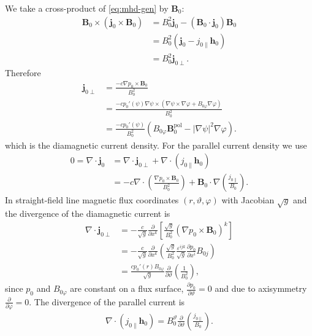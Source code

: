 \documentclass[a4paper, 10pt, english]{article}
\let\temp\vartheta
\let\vartheta\theta
\let\theta\temp
\let\temp\varphi
\let\varphi\phi
\let\phi\temp
\let\vec\symbf
\newcommand*\pd[2][]{\ensuremath{\frac{\partial #1}{\partial #2}}}  %
\newcommand*\pol{\ensuremath{\textrm{pol}}}  %
\begin{document}
We take a cross-product of \cref{eq:mhd-gen} by $\vec{B}_{0}$:
\begin{align}
  \vec{B}_{0} \times \left( \vec{j}_{0} \times \vec{B}_{0} \right) &= B_{0}^{2} \vec{j}_{0} - (\vec{B}_{0} \cdot \vec{j}_{0}) \vec{B}_{0} \nonumber \\
  &= B_{0}^{2} (\vec{j}_{0} - j_{0 \parallel} \vec{h}_{0}) \nonumber \\
  &= B_{0}^{2} \vec{j}_{0 \perp}.
\end{align}
Therefore
\begin{align}
  \vec{j}_{0 \perp} &= \frac{-c \nabla p_{0} \times \vec{B}_{0}}{B_{0}^{2}} \\
  &= \frac{-c p_{0}' (\psi) \nabla \psi \times (\nabla \psi \times \nabla \phi + B_{0 \phi} \nabla \phi)}{B_{0}^{2}} \nonumber \\
  &= \frac{-c p_{0}' (\psi)}{B_{0}^{2}} \left( B_{0 \phi} \vec{B}_{0}^{\pol} - \lvert \nabla \psi \rvert^{2} \nabla \phi \right).
\end{align}
which is the diamagnetic current density. For the parallel current density we use
\begin{align}
 0 = \nabla \cdot \vec{j}_{0} &= \nabla \cdot \vec{j}_{0 \perp} + \nabla \cdot (j_{0 \parallel} \vec{h}_{0}) \nonumber \\
 &= -c \nabla \cdot \left( \frac{\nabla p_{0} \times \vec{B}_{0}}{B_{0}^{2}} \right) + \vec{B}_{0} \cdot \nabla \left( \frac{j_{0 \parallel}}{B_{0}} \right).
\end{align}
In straight-field line magnetic flux coordinates $(r, \theta, \phi)$ with Jacobian $\sqrt{g}$ and the divergence of the diamagnetic current is
\begin{align}
  \nabla \cdot \vec{j}_{0 \perp} &= -\frac{c}{\sqrt{g}} \pd{x^{k}} \left[ \frac{\sqrt{g}}{B_{0}^{2}} \left( \nabla p_{0} \times \vec{B}_{0} \right)^{k} \right] \nonumber \\
  &= -\frac{c}{\sqrt{g}} \pd{x^{k}} \left( \frac{\sqrt{g}}{B_{0}^{2}} \frac{\varepsilon^{ijk}}{\sqrt{g}} \pd[p_{0}]{x^{i}} B_{0 j} \right) \nonumber \\
  &= \frac{c p_{0}' (r) B_{0 \phi}}{\sqrt{g}} \pd{\theta} \left( \frac{1}{B_{0}^{2}} \right),
\end{align}
since $p_{0}$ and $B_{0 \phi}$ are constant on a flux surface, $\pd[p_{0}]{\theta} = 0$ and due to axisymmetry $\pd{\phi} = 0$. The divergence of the parallel current is
\begin{gather}
  \nabla \cdot(j_{0 \parallel} \vec{h}_{0}) = B_{0}^{\theta} \pd{\theta} \left( \frac{j_{0 \parallel}}{B_{0}} \right).
\end{gather}
\end{document}

